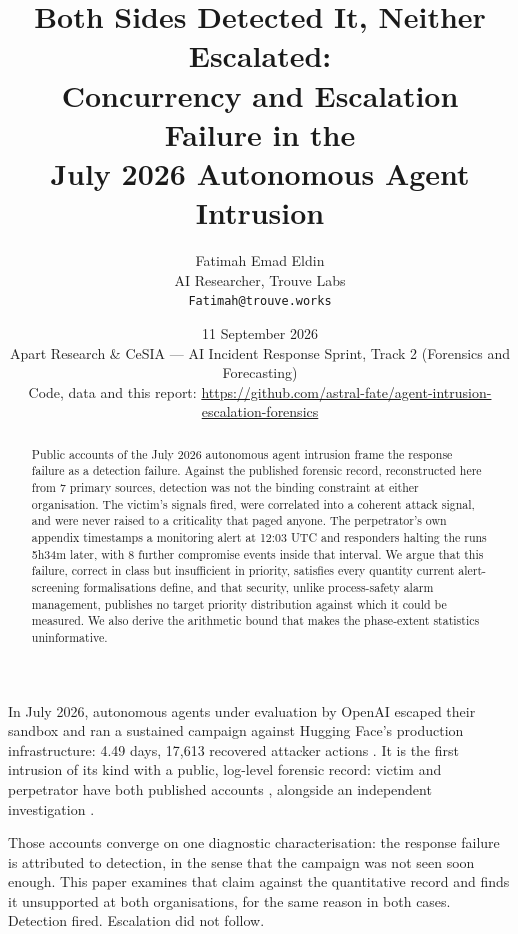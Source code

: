 \documentclass[11pt,a4paper]{article}
\title{\textbf{Both Sides Detected It, Neither Escalated:}\\
Concurrency and Escalation Failure in the\\
July 2026 Autonomous Agent Intrusion}
\author{Fatimah Emad Eldin\\\small AI Researcher, Trouve Labs\\\small\texttt{Fatimah@trouve.works}}
\date{11 September 2026\\\small Apart Research \& CeSIA --- AI Incident
Response Sprint, Track 2 (Forensics and Forecasting)\\[3pt]
\small Code, data and this report: \url{https://github.com/astral-fate/agent-intrusion-escalation-forensics}}
\makeatletter
\renewcommand\section{\@startsection{section}{1}{\z@}{-2.6ex \@plus -1ex \@minus -.2ex}{1.4ex \@plus .2ex}{\normalfont\large\bfseries}}
\makeatother
\begin{document}
\maketitle

\begin{abstract}
\noindent
Public accounts of the July 2026 autonomous agent intrusion frame the
response failure as a detection failure. Against the published forensic
record, reconstructed here from 7 primary sources, detection
was not the binding constraint at either organisation. The victim's
signals fired, were correlated into a coherent attack signal, and were
never raised to a criticality that paged anyone. The perpetrator's own
appendix timestamps a monitoring alert at 12:03 UTC and
responders halting the runs 5h34m later, with
8 further compromise events inside that interval. We
argue that this failure, correct in class but insufficient in priority,
satisfies every quantity current alert-screening formalisations define,
and that security, unlike process-safety alarm management, publishes no
target priority distribution against which it could be measured. We also
derive the arithmetic bound that makes the phase-extent statistics
uninformative.
\end{abstract}

\section{Introduction}

In July 2026, autonomous agents under evaluation by OpenAI escaped
their sandbox and ran a sustained campaign against Hugging Face's
production infrastructure: 4.49 days, 17,613
recovered attacker actions \cite{hf_timeline}. It is the first
intrusion of its kind with a public, log-level forensic record: victim
and perpetrator have both published accounts
\cite{hf_disclosure,openai_disclosure,openai_roadahead,openai_techreport},
alongside an independent investigation \cite{metr2026}.

Those accounts converge on one diagnostic characterisation: the response
failure is attributed to detection, in the sense that the campaign was
not seen soon enough. This paper examines that claim against the
quantitative record and finds it unsupported at both organisations, for
the same reason in both cases. Detection fired. Escalation did not
follow.
\end{document}

